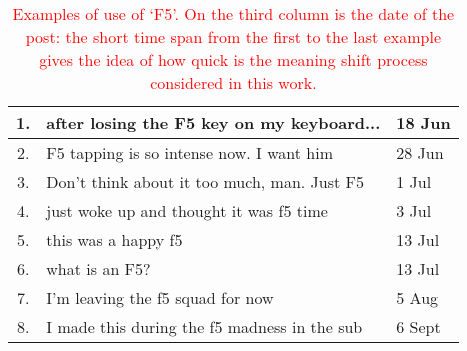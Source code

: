 \begin{table}[t]\centering   \small
    \begin{tabular}{cp{5.5cm}l}
        \hline
        1. & after losing the F5 key on my keyboard... & 18 Jun\\\hline
        2. & F5 tapping is so intense now. I want him & 28 Jun\\\hline
        3. & Don't think about it too much, man. Just F5 & 1 Jul\\\hline
        4. & just woke up and thought it was f5 time & 3 Jul\\\hline
        5. & this was a happy f5 & 13 Jul\\\hline
        6. & what is an F5? & 13 Jul \\\hline
        7. & I'm leaving the f5 squad for now & 5 Aug\\\hline
        8. & I made this during the f5 madness in the sub & 6 Sept\\\hline
        
    \end{tabular}
    \vspace*{-0.2cm}
    \caption{\textcolor{red}{Examples of use of `F5'. On the third column is the date of the post: the short time span  from the first to the last example gives the idea of how quick is the meaning shift process considered in this work.}}
    \vspace*{-0.2cm}
     \label{table:f5}
\end{table}